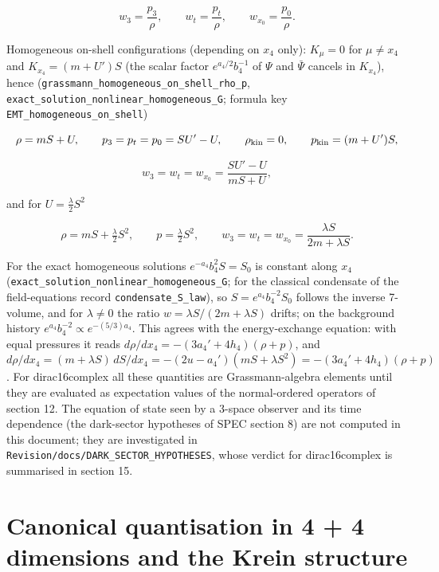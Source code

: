 \documentclass[11pt]{article}
\begin{document}
\[
w_3 = \frac{p_3}{\rho},\qquad w_t = \frac{p_t}{\rho},\qquad w_{x_0} = \frac{p_0}{\rho}.
\]

Homogeneous on-shell configurations (depending on $x_4$ only): $K_\mu = 0$ for $\mu \neq x_4$ and $K_{x_4} = (m + U')S$ (the scalar factor $e^{a_4/2}b_4^{-1}$ of $\Psi$ and $\bar\Psi$ cancels in $K_{x_4}$), hence (\texttt{grassman\allowbreak{}n\_homoge\allowbreak{}neous\_on\allowbreak{}\_shell\_r\allowbreak{}ho\_p}, \texttt{exact\_so\allowbreak{}lution\_n\allowbreak{}onlinear\allowbreak{}\_homogen\allowbreak{}eous\_G}; formula key \texttt{EMT\_homo\allowbreak{}geneous\_\allowbreak{}on\_shell})

\[
\rho = mS + U,\qquad p_3 = p_t = p_0 = SU' - U,\qquad \rho_{\rm kin} = 0,\qquad p_{\rm kin} = (m + U')S,
\]

\[
w_3 = w_t = w_{x_0} = \frac{SU' - U}{mS + U},
\]

and for $U = \frac{\lambda}{2}S^2$

\[
\rho = mS + \tfrac{\lambda}{2}S^2,\qquad p = \tfrac{\lambda}{2}S^2,\qquad w_3 = w_t = w_{x_0} = \frac{\lambda S}{2m + \lambda S} .
\]

For the exact homogeneous solutions $e^{-a_4}b_4^2S = S_0$ is constant along $x_4$ (\texttt{exact\_so\allowbreak{}lution\_n\allowbreak{}onlinear\allowbreak{}\_homogen\allowbreak{}eous\_G}; for the classical condensate of the field-equations record \texttt{condensa\allowbreak{}te\_S\_law}), so $S = e^{a_4}b_4^{-2}S_0$ follows the inverse 7-volume, and for $\lambda \neq 0$ the ratio $w = \lambda S/(2m + \lambda S)$ drifts; on the background history $e^{a_4}b_4^{-2} \propto e^{-(5/3)a_4}$. This agrees with the energy-exchange equation: with equal pressures it reads $d\rho/dx_4 = -(3a_4' + 4h_4)(\rho + p)$, and $d\rho/dx_4 = (m + \lambda S)\,dS/dx_4 = -(2u - a_4')(mS + \lambda S^2) = -(3a_4' + 4h_4)(\rho + p)$. For dirac16complex all these quantities are Grassmann-algebra elements until they are evaluated as expectation values of the normal-ordered operators of section 12. The equation of state seen by a 3-space observer and its time dependence (the dark-sector hypotheses of SPEC section 8) are not computed in this document; they are investigated in \texttt{Revision\allowbreak{}/docs/DA\allowbreak{}RK\_SECTO\allowbreak{}R\_HYPOTH\allowbreak{}ESES}, whose verdict for dirac16complex is summarised in section 15.

\section{Canonical quantisation in 4 + 4 dimensions and the Krein structure}
\end{document}
